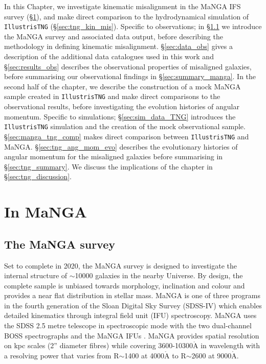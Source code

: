 In this Chapter, we investigate kinematic misalignment in the MaNGA IFS survey (\S\ref{sec:manga_kin_mis}), and make direct comparison to the hydrodynamical simulation of \texttt{IllustrisTNG} (\S\ref{sec:tng_kin_mis}). Specific to observations; in \S\ref{sec:manga_intro} we introduce the MaNGA survey and associated data output, before describing the methodology in defining kinematic misalignment. \S\ref{sec:data_obs} gives a description of the additional data catalogues used in this work and \S\ref{sec:results_obs} describes the observational properties of misaligned galaxies, before summarising our observational findings in \S\ref{sec:summary_manga}. In the second half of the chapter, we describe the construction of a mock MaNGA sample created in \texttt{IllustrisTNG} and make direct comparisons to the observational results, before investigating the evolution histories of angular momentum. Specific to simulations; \S\ref{sec:sim_data_TNG} introduces the \texttt{IllustrisTNG} simulation and the creation of the mock observational sample. \S\ref{sec:manga_tng_comp} makes direct comparison between \texttt{IllustrisTNG} and MaNGA. \S\ref{sec:tng_ang_mom_evo} describes the evolutionary histories of angular momentum for the misaligned galaxies before summarising in \S\ref{sec:tng_summary}. We discuss the implications of the chapter in \S\ref{sec:tng_discussion}.

\section{In MaNGA} \label{sec:manga_kin_mis}
\subsection{The MaNGA survey} \label{sec:manga_intro}
Set to complete in 2020, the MaNGA survey is designed to investigate the internal structure of $\sim$10000 galaxies in the nearby Universe. By design, the complete sample is unbiased towards morphology, inclination and colour and provides a near flat distribution in stellar mass. 
MaNGA is one of three programs in the fourth generation of the Sloan Digital Sky Survey (SDSS-IV) which enables detailed kinematics through integral field unit (IFU) spectroscopy. MaNGA uses the SDSS 2.5 metre telescope in spectroscopic mode \citep{gunn2006} with the two dual-channel BOSS spectrographs \citep{smee2013} and the MaNGA IFUs \citep{drory2015}. MaNGA provides spatial resolution on kpc scales (2'' diameter fibres) while covering 3600-10300$\mathrm{\mathring{A}}$ in wavelength with a resolving power that varies from R$\sim$1400 at 4000$\mathrm{\mathring{A}}$ to R$\sim$2600 at 9000$\mathrm{\mathring{A}}$. 

